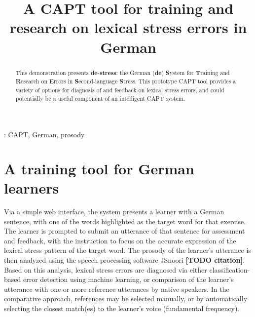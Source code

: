 \documentclass[a4paper]{article}
\title{A CAPT tool for training and research on lexical stress errors in German}
\newcommand{\TODO}[1]{{\color{red}\textbf{[TODO #1]}}}
\begin{document}
  \maketitle
  \begin{abstract}
    This demonstration presents \textbf{de-stress}: the German (\textbf{de}) \textbf{S}ystem for \textbf{T}raining and \textbf{R}esearch on \textbf{E}rrors in \textbf{S}econd-language \textbf{S}tress. 
    This prototype CAPT tool provides a variety of options for diagnosis of and feedback on lexical stress errors, and could potentially be a useful component of an intelligent CAPT system.
  \end{abstract}
  : CAPT, German, prosody


	
%

\section{A training tool for German learners}

 Via a simple web interface, the system presents a learner with a German sentence,
 with one of the words highlighted as the target word for that exercise. The learner is prompted to submit an utterance of that sentence for assessment and feedback, with the instruction to focus on the accurate expression of the lexical stress pattern of the target word. The prosody of the learner's utterance is then analyzed using the speech processing software JSnoori \TODO{citation}. Based on this analysis, lexical stress errors are diagnosed via either classification-based error detection using machine learning, or comparison of the learner's utterance with one or more reference utterances by native speakers. In the comparative approach, references may be selected manually, or by automatically selecting the closest match(es) to the learner's voice (fundamental frequency). 
 
\end{document}
